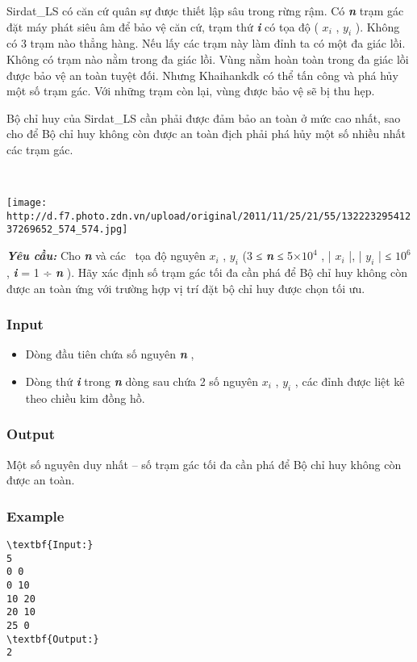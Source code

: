 

Sirdat\_LS có căn cứ quân sự được thiết lập sâu trong rừng rậm. Có \textbf{\emph{ n }} trạm gác đặt máy phát siêu âm để bảo vệ căn cứ, trạm thứ \textbf{\emph{ i }} có tọa độ ( \textbf{\emph{ $x_{i}$}} , \textbf{\emph{ $y_{i}$}} ). Không có 3 trạm nào thẳng hàng. Nếu lấy các trạm này làm đỉnh ta có một đa giác lồi. Không có trạm nào nằm trong đa giác lồi. Vùng nằm hoàn toàn trong đa giác lồi được bảo vệ an toàn tuyệt đối. Nhưng Khaihankdk có thể tấn công và phá hủy một số trạm gác. Với những trạm còn lại, vùng được bảo vệ sẽ bị thu hẹp.

Bộ chỉ huy của Sirdat\_LS cần phải được đảm bảo an toàn ở mức cao nhất, sao cho để Bộ chỉ huy không còn được an toàn địch phải phá hủy một số nhiều nhất các trạm gác.

 


\texttt{[image: http://d.f7.photo.zdn.vn/upload/original/2011/11/25/21/55/13222329541237269652\_574\_574.jpg]}

\textbf{\emph{Yêu cầu: }} Cho \textbf{\emph{ n }} và các  tọa độ nguyên \textbf{\emph{ $x_{i}$}} , \textbf{\emph{ $y_{i}$}} (3 ≤ \textbf{\emph{ n }} ≤ 5×$10^{4}$ , | \textbf{\emph{ $x_{i}$}} |, | \textbf{\emph{ $y_{i}$}} | ≤ $10^{6}$ , \textbf{\emph{ i }} = 1 ÷ \textbf{\emph{ n }} ). Hãy xác định số trạm gác tối đa cần phá để Bộ chỉ huy không còn được an toàn ứng với trường hợp vị trí đặt bộ chỉ huy được chọn tối ưu.

\subsubsection{Input}
\begin{itemize}
	\item Dòng đầu tiên chứa số nguyên \textbf{\emph{ n }} ,
	\item Dòng thứ \textbf{\emph{ i }} trong \textbf{\emph{ n }} dòng sau chứa 2 số nguyên \textbf{\emph{ $x_{i}$}} , \textbf{\emph{ $y_{i}$}} , các đỉnh được liệt kê theo chiều kim đồng hồ.
\end{itemize}

\subsubsection{Output}

Một số nguyên duy nhất – số trạm gác tối đa cần phá để Bộ chỉ huy không còn được an toàn.

\subsubsection{Example}
\begin{verbatim}
\textbf{Input:}
5
0 0
0 10
10 20
20 10
25 0
\textbf{Output:}
2
\end{verbatim}
